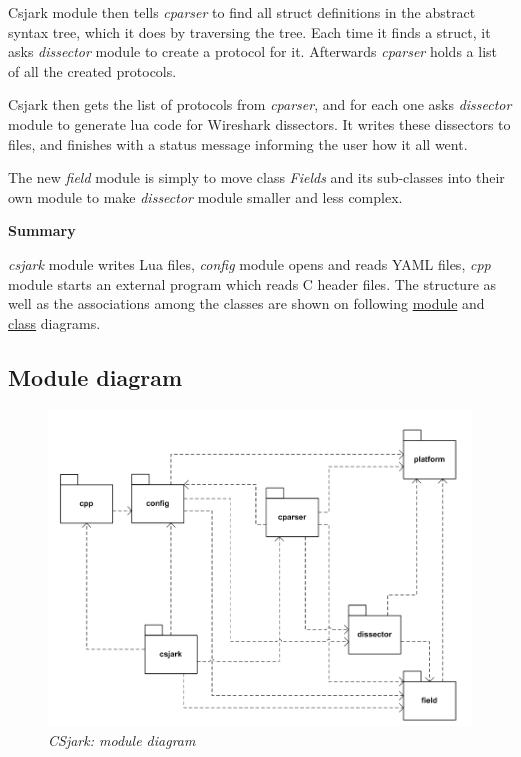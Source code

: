\documentclass[A4paper,10pt,english]{sphinxmanual}
\begin{document}
Csjark module then tells \emph{cparser} to find all struct definitions in the abstract syntax tree, which it does by traversing the tree. Each time it finds a struct, it asks \emph{dissector} module to create a protocol for it. Afterwards \emph{cparser} holds a list of all the created protocols.

Csjark then gets the list of protocols from \emph{cparser}, and for each one asks \emph{dissector} module to generate lua code for Wireshark dissectors. It writes these dissectors to files, and finishes with a status message informing the user how it all went.

The new \emph{field} module is simply to move class \emph{Fields} and its sub-classes into their own module to make \emph{dissector} module smaller and less complex.

\textbf{Summary}

\emph{csjark} module writes Lua files, \emph{config} module opens and reads YAML files, \emph{cpp} module starts an external program which reads C header files. The structure as well as the associations among the classes are shown on following {\hyperref[devel/design:module]{module}} and {\hyperref[devel/design:class]{class}} diagrams.


\subsection{Module diagram}
\label{devel/design:module-diagram}\label{devel/design:module}\begin{figure}[htbp]
\centering
\capstart

\includegraphics[width=0.600\linewidth]{img/module_diagram.png}
\caption{\emph{CSjark: module diagram}}\end{figure}
\end{document}
